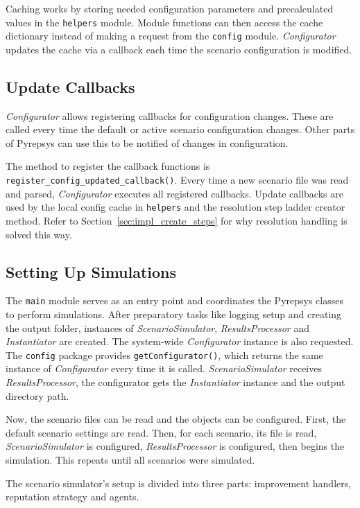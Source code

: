 \documentclass[%
    ]{\PathToTumTemplate/thesis/tum_thesis}
\begin{document}
Caching works by storing needed configuration parameters and precalculated values in the \texttt{helpers} module.
Module functions can then access the cache dictionary instead of making a request from the \texttt{config} module.
\emph{Configurator} updates the cache via a callback each time the scenario configuration is modified.


\subsection{Update Callbacks}\label{sec:config_update_callbacks}
\emph{Configurator} allows registering callbacks for configuration changes.
These are called every time the default or active scenario configuration changes.
Other parts of Pyrepsys can use this to be notified of changes in configuration.

The method to register the callback functions is \lstinline{register_config_updated_callback()}.
Every time a new scenario file was read and parsed, \emph{Configurator} executes all registered callbacks.
Update callbacks are used by the local config cache in \texttt{helpers} and the resolution step ladder creator method.
Refer to Section~\ref{sec:impl_create_steps} for why resolution handling is solved this way.


\subsection{Setting Up Simulations}
The \texttt{main} module serves as an entry point and coordinates the Pyrepsys classes to perform simulations.
After preparatory tasks like logging setup and creating the output folder, instances of \emph{ScenarioSimulator}, \emph{ResultsProcessor} and \emph{Instantiator} are created.
The system-wide \emph{Configurator} instance is also requested.
The \texttt{config} package provides \lstinline{getConfigurator()}, which returns the same instance of \emph{Configurator} every time it is called.
\emph{ScenarioSimulator} receives \emph{ResultsProcessor}, the configurator gets the \emph{Instantiator} instance and the output directory path.

Now, the scenario files can be read and the objects can be configured.
First, the default scenario settings are read.
Then, for each scenario, its file is read, \emph{ScenarioSimulator} is configured, \emph{ResultsProcessor} is configured, then begins the simulation.
This repeats until all scenarios were simulated.

The scenario simulator's setup is divided into three parts: improvement handlers, reputation strategy and agents.
\end{document}
